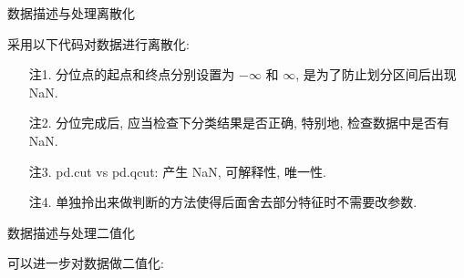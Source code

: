 \begin{frame}{数据描述与处理}{离散化}

\vspace{-0.2cm}

采用以下代码对数据进行离散化:

\vspace{0.1cm}

\begin{figure}[bth]
\end{figure}

\vspace{0.2cm}

{\linespread{1}\small
\begin{itemize}
\item[注1.] 分位点的起点和终点分别设置为 $-\infty$ 和 $\infty$, 是为了防止划分区间后出现 NaN.
\item[注2.] 分位完成后, 应当检查下分类结果是否正确, 特别地, 检查数据中是否有 NaN.

\vspace{-0.47cm}

\begin{figure}[bth]
\end{figure}

\vspace{-0.2cm}

\item[注3.] pd.cut vs pd.qcut: 产生 NaN, 可解释性, 唯一性.
\item[注4.] 单独拎出来做判断的方法使得后面舍去部分特征时不需要改参数.
\end{itemize}}
\end{frame}

\begin{frame}{数据描述与处理}{二值化}

\vspace{-0.2cm}

可以进一步对数据做二值化:

\vspace{0.1cm}

\begin{figure}[bth]
\end{figure}

\end{frame}

